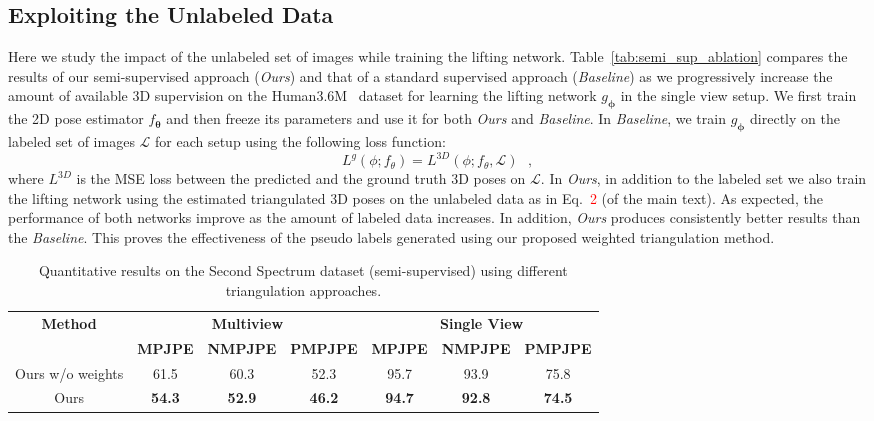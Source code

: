 \documentclass[runningheads]{llncs}
\def\Mat#1{{\boldsymbol{#1}}}
\newcommand{\mL}{\mathcal{L}}
\begin{document}
\subsection*{Exploiting the Unlabeled Data}
Here we study the impact of the unlabeled set of images while training the lifting network. Table~\ref{tab:semi_sup_ablation} compares the results of our semi-supervised approach ({\it Ours}) and that of a standard supervised approach ({\it Baseline}) as we progressively increase the amount of available 3D supervision on the Human3.6M~\cite{Ionescu14a} dataset for learning the lifting network $g_{\Mat{\phi}}$ in the single view setup. We first train the 2D pose estimator $f_{\Mat{\theta}}$ and then freeze its parameters and use it for both {\it Ours} and {\it Baseline}. In {\it Baseline}, we train $g_{\Mat{\phi}}$ directly on the labeled set of images $\mL$ for each setup using the following loss function:
\begin{equation}
	L^g(\phi; f_{\theta}) = L^{3D}(\phi; f_{\theta}, \mathcal{L})~~~,
\end{equation}
where $L^{3D}$ is the MSE loss between the predicted and the ground truth 3D poses on $\mL$. In {\it Ours}, in addition to the labeled set we also train the lifting network using the estimated triangulated 3D poses on the unlabeled data as in Eq.~\textcolor{red}{2} (of the main text). As expected, the performance of both networks improve as the amount of labeled data increases. In addition, {\it Ours} produces consistently better results than the {\it Baseline}. This proves the effectiveness of the pseudo labels generated using our proposed weighted triangulation method. 











 
\begin{table*}[t]
\caption{Quantitative results on the Second Spectrum dataset (semi-supervised) using different triangulation approaches.}
\label{tab:second_spectrum}
\begin{tabular}{c|ccc|ccc}
\toprule
		\textbf{Method} & \multicolumn{3}{c|}{\textbf{Multiview}} & \multicolumn{3}{c}{\textbf{Single View}} \\
		\cmidrule{1-7}
		& \textbf{MPJPE} & \textbf{NMPJPE} & \textbf{PMPJPE} & \textbf{MPJPE} & \textbf{NMPJPE} & \textbf{PMPJPE} \\
		\midrule
Ours w/o weights & 61.5 & 60.3 & 52.3 & 95.7 & 93.9 & 75.8 \\
Ours & \textbf{54.3} & \textbf{52.9} & \textbf{46.2} & \textbf{94.7} & \textbf{92.8} & \textbf{74.5} \\
\bottomrule
\end{tabular}
\end{table*}
 
\end{document}
